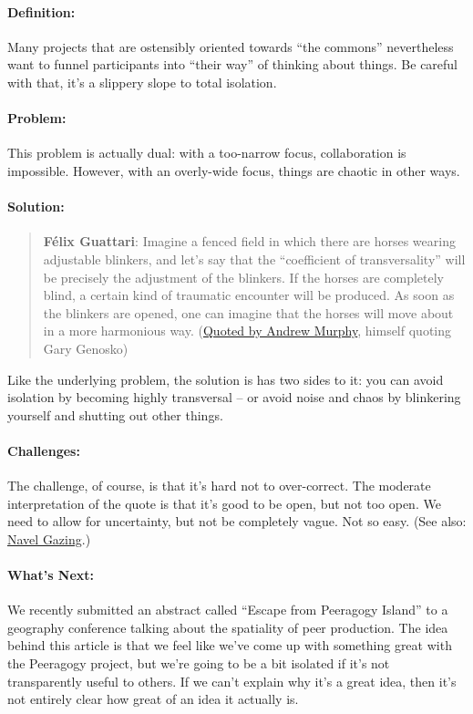 \paragraph{Definition:} Many projects that are ostensibly oriented towards
``the commons'' nevertheless want to funnel participants into ``their
way'' of thinking about things. Be careful with that, it's a slippery
slope to total isolation.

\paragraph{Problem:} This problem is actually dual: with a too-narrow
focus, collaboration is impossible. However, with an overly-wide focus,
things are chaotic in other ways.

\paragraph{Solution:}

\begin{quote}
\textbf{Félix Guattari}: Imagine a fenced field in which there are
horses wearing adjustable blinkers, and let's say that the ``coefficient
of transversality'' will be precisely the adjustment of the blinkers. If
the horses are completely blind, a certain kind of traumatic encounter
will be produced. As soon as the blinkers are opened, one can imagine
that the horses will move about in a more harmonious way.
(\href{http://nine.fibreculturejournal.org/}{Quoted by Andrew Murphy},
himself quoting Gary Genosko)
\end{quote}


Like the underlying problem, the solution is has two sides to it: you can avoid
isolation by becoming highly transversal -- or avoid noise and chaos by
blinkering yourself and shutting out other things.  

\paragraph{Challenges:} The challenge, of course, is that it's hard not to over-correct.  The moderate interpretation of the quote is
that it's good to be open, but not too open.  We need to allow for
uncertainty, but not be completely vague.  Not so easy. (See
also: \href{http://peeragogy.org/antipatterns/navel-gazing/}{Navel
Gazing}.)

\paragraph{What's Next:} We recently submitted an abstract called ``Escape
from Peeragogy Island'' to a geography conference talking about the
spatiality of peer production. The idea behind this article is that we
feel like we've come up with something great with the Peeragogy project,
but we're going to be a bit isolated if it's not transparently useful to
others. If we can't explain why it's a great idea, then it's not
entirely clear how great of an idea it actually is.
